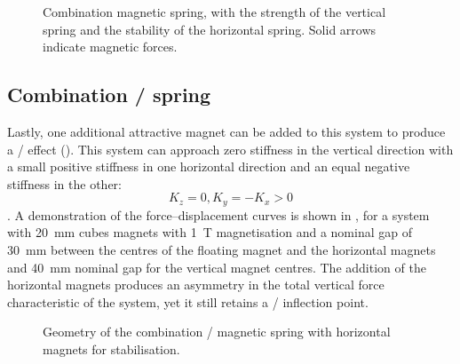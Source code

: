 \documentclass[11pt,a4paper]{memoir}
\begin{document}
\begin{figure}
   \caption[Combination vertical/horizontal magnetic spring.]{Combination magnetic spring, with the strength of the vertical spring and the stability of the horizontal spring. Solid arrows indicate magnetic forces.}
\end{figure}


\subsection{Combination \qzs/ spring}

Lastly, one additional attractive magnet can be added to this system to produce a \qzs/ effect ().
This system can approach zero stiffness in the vertical direction with a small positive stiffness in one horizontal direction and an equal negative stiffness in the other:
\begin{dmath}[compact]
K_z=0,K_y=-K_x>0
\end{dmath}.
A demonstration of the force--displacement curves is shown in , for a system with \SI{20}{mm} cubes magnets with \SI{1}{T} magnetisation and a nominal gap of \SI{30}{mm} between the centres of the floating magnet and the horizontal magnets and \SI{40}{mm} nominal gap for the vertical magnet centres.
The addition of the horizontal magnets produces an asymmetry in the total vertical force characteristic of the system, yet it still retains a \qzs/ inflection point.

\begin{figure}
   \caption{Geometry of the combination \qzs/ magnetic spring with horizontal magnets for stabilisation.}
\end{figure}

\begin{figure}
   \centering
\end{figure}


\newcommand\isoforces[2]{%
  \begin{figure}[p]
    \begin{wide}
      \vspace*{-0.5cm}
      \centerline{
      \subfloat[$x$-forces.\figlabel{iso-#1-x}]{%
        \psfragfig
          {PhD/Simulations/Single_magnets/all_springs/frag/#1-xforce}%
      }\hspace*{-0.5cm}%
      \subfloat[$y$-forces.\figlabel{iso-#1-y}]{%
        \psfragfig
          {PhD/Simulations/Single_magnets/all_springs/frag/#1-yforce}%
      }\hspace*{-0.5cm}%
      \subfloat[$z$-forces.\figlabel{iso-#1-z}]{%
        \psfragfig
          {PhD/Simulations/Single_magnets/all_springs/frag/#1-zforce}%
      }%
      }%
    \end{wide}
    \caption{#2}
    \figlabel{#1-forces}
  \end{figure}
}
\end{document}
